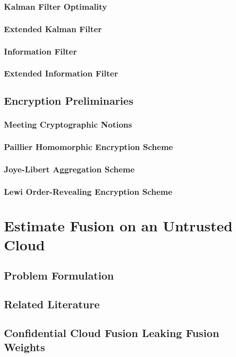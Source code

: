 \documentclass[oneside]{scrbook}
\begin{document}
\subsection{Kalman Filter Optimality}
\subsection{Extended Kalman Filter}
\subsection{Information Filter}
\subsection{Extended Information Filter}
\section{Encryption Preliminaries}
\subsection{Meeting Cryptographic Notions}
\subsection{Paillier Homomorphic Encryption Scheme}
\subsection{Joye-Libert Aggregation Scheme}
\subsection{Lewi Order-Revealing Encryption Scheme}

\chapter{Estimate Fusion on an Untrusted Cloud}
\section{Problem Formulation}
\section{Related Literature}
\section{Confidential Cloud Fusion Leaking Fusion Weights}
\end{document}
